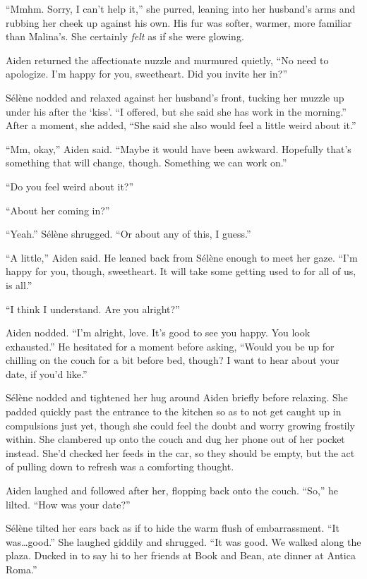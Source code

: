 ``Mmhm. Sorry, I can't help it,'' she purred, leaning into her husband's arms and rubbing her cheek up against his own. His fur was softer, warmer, more familiar than Malina's. She certainly \emph{felt} as if she were glowing.

Aiden returned the affectionate nuzzle and murmured quietly, ``No need to apologize. I'm happy for you, sweetheart. Did you invite her in?''

Sélène nodded and relaxed against her husband's front, tucking her muzzle up under his after the `kiss'. ``I offered, but she said she has work in the morning.'' After a moment, she added, ``She said she also would feel a little weird about it.''

``Mm, okay,'' Aiden said. ``Maybe it would have been awkward. Hopefully that's something that will change, though. Something we can work on.''

``Do you feel weird about it?''

``About her coming in?''

``Yeah.'' Sélène shrugged. ``Or about any of this, I guess.''

``A little,'' Aiden said. He leaned back from Sélène enough to meet her gaze. ``I'm happy for you, though, sweetheart. It will take some getting used to for all of us, is all.''

``I think I understand. Are you alright?''

Aiden nodded. ``I'm alright, love. It's good to see you happy. You look exhausted.'' He hesitated for a moment before asking, ``Would you be up for chilling on the couch for a bit before bed, though? I want to hear about your date, if you'd like.''

Sélène nodded and tightened her hug around Aiden briefly before relaxing. She padded quickly past the entrance to the kitchen so as to not get caught up in compulsions just yet, though she could feel the doubt and worry growing frostily within. She clambered up onto the couch and dug her phone out of her pocket instead. She'd checked her feeds in the car, so they should be empty, but the act of pulling down to refresh was a comforting thought.

Aiden laughed and followed after her, flopping back onto the couch. ``So,'' he lilted. ``How was your date?''

Sélène tilted her ears back as if to hide the warm flush of embarrassment. ``It was\ldots{}good.'' She laughed giddily and shrugged. ``It was good. We walked along the plaza. Ducked in to say hi to her friends at Book and Bean, ate dinner at Antica Roma.''


